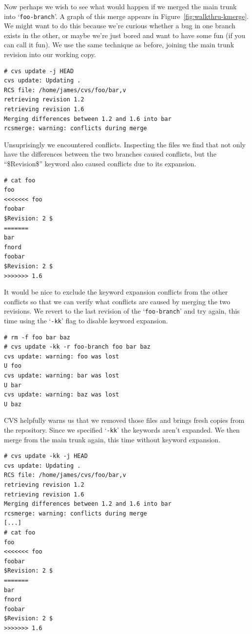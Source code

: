 \documentclass[12pt,letterpaper]{article}
\newcommand{\cmd}[1]{`\texttt{#1}'}
\begin{document}
Now perhaps we wish to see what would happen if we merged the main trunk into
\cmd{foo-branch}.  A graph of this merge appears in
Figure~\ref{fig:walkthru-kmerge}. We might want to do this because we're
curious whether a bug in one branch exists in the other, or maybe we're just
bored and want to have some fun (if you can call it fun).  We use the same
technique as before, joining the main trunk revision into our working copy.

\begin{Verbatim}
# cvs update -j HEAD
cvs update: Updating .
RCS file: /home/james/cvs/foo/bar,v
retrieving revision 1.2
retrieving revision 1.6
Merging differences between 1.2 and 1.6 into bar
rcsmerge: warning: conflicts during merge
\end{Verbatim}

Unsuprisingly we encountered conflicts.  Inspecting the files we find that not
only have the differences between the two branches caused conflicts, but the
``\$Revision\$'' keyword also caused conflicts due to its expansion.

\begin{Verbatim}
# cat foo
foo
<<<<<<< foo
foobar
$Revision: 2 $
=======
bar
fnord
foobar
$Revision: 2 $
>>>>>>> 1.6
\end{Verbatim}

It would be nice to exclude the keyword expansion conflicts from the other
conflicts so that we can verify what conflicts are caused by merging the two
revisions.  We revert to the last revision of the \cmd{foo-branch} and try
again, this time using the \cmd{-kk} flag to disable keyword expansion.

\begin{Verbatim}
# rm -f foo bar baz
# cvs update -kk -r foo-branch foo bar baz
cvs update: warning: foo was lost
U foo
cvs update: warning: bar was lost
U bar
cvs update: warning: baz was lost
U baz
\end{Verbatim}

CVS helpfully warns us that we removed those files and brings fresh copies
from the repository.  Since we specified \cmd{-kk} the keywords aren't
expanded.  We then merge from the main trunk again, this time without keyword
expansion.

\begin{Verbatim}
# cvs update -kk -j HEAD
cvs update: Updating .
RCS file: /home/james/cvs/foo/bar,v
retrieving revision 1.2
retrieving revision 1.6
Merging differences between 1.2 and 1.6 into bar
rcsmerge: warning: conflicts during merge
[...]
# cat foo
foo
<<<<<<< foo
foobar
$Revision: 2 $
=======
bar
fnord
foobar
$Revision: 2 $
>>>>>>> 1.6
\end{Verbatim}
\end{document}
